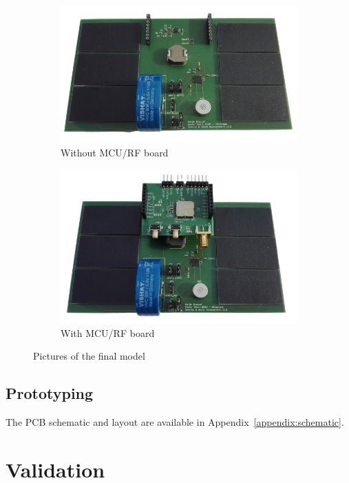 \documentclass{EPL-master-thesis-covers-EN}
\begin{document}
\begin{figure}[H]
\begin{subfigure}{.5\textwidth}
  \centering
  \includegraphics[width=.9\linewidth]{real_PCB.png}  
  \caption{Without MCU/RF board}
\end{subfigure}
\begin{subfigure}{.48\textwidth}
  \centering
  \includegraphics[width=.9\linewidth]{real_PCB_with_MCU.png}  
  \caption{With MCU/RF board}
\end{subfigure}
\caption{Pictures of the final model}
\label{fig:final_model_picture}
\end{figure}

\subsection*{Prototyping}

The PCB schematic and layout are available in Appendix~\ref{appendix:schematic}.

\section{Validation}
\end{document}
